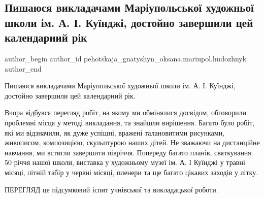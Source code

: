  
 
 
 
 

\subsection{Пишаюся викладачами Маріупольської художньої школи ім. А. І. Куїнджі, достойно завершили цей календарний рік}
\label{sec:28_12_2021.fb.pehotskaja_gnatyshyn_oksana.mariupol.hudozhnyk.1.pyshajusja_vykladachamy}

\ifcmt
 author_begin
   author_id pehotskaja_gnatyshyn_oksana.mariupol.hudozhnyk
 author_end
\fi

Пишаюся викладачами Маріупольської художньої школи ім. А. І. Куїнджі, достойно
завершили цей календарний рік.

Вчора відбувся перегляд  робіт, на якому ми обмінялися досвідом, обговорили
проблемні місця у методі викладання, та знайшли вирішення. Багато було робіт,
які ми відзначили, як дуже успішні, вражені талановитими рисунками, живописом,
композицією, скульптурою наших дітей. Не зважаючи на дистанційне навчання, ми
встигли завершити півріччя. Попереду багато планів, святкування 50 річчя нашої
школи, виставка у художньому музеї ім. А. І Куїнджі у травні місяці, літній
табір у червні місяці, пленери та ще багато цікавих заходів у літку. 

ПЕРЕГЛЯД це підсумковий іспит учнівської та викладацької роботи.

